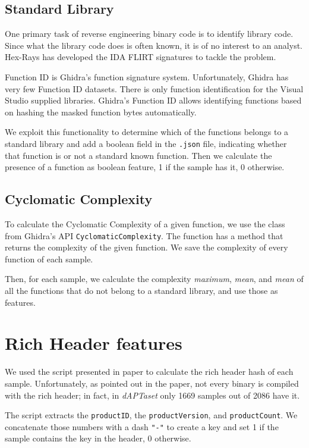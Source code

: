 \subsection{Standard Library}

One primary task of reverse engineering binary code is to identify library code. Since what the library code does is often known, it is of no interest to an analyst. Hex-Rays has developed the IDA FLIRT signatures to tackle the problem. 

Function ID is Ghidra's function signature system. Unfortunately, Ghidra has very few Function ID datasets. There is only function identification for the Visual Studio supplied libraries. Ghidra's Function ID allows identifying functions based on hashing the masked function bytes automatically\cite{ghidra_fid}.

We exploit this functionality to determine which of the functions belongs to a standard library and add a boolean field in the \texttt{.json} file, indicating whether that function is or not a standard known function. Then we calculate the presence of a function as boolean feature, 1 if the sample has it, 0 otherwise.

\subsection{Cyclomatic Complexity}

To calculate the Cyclomatic Complexity of a given function, we use the class from Ghidra's API \texttt{CyclomaticComplexity}. The function has a method that returns the complexity of the given function. We save the complexity of every function of each sample. 

Then, for each sample, we calculate the complexity \textit{maximum}, \textit{mean}, and \textit{mean} of all the functions that do not belong to a standard library, and use those as features.



\section{Rich Header features}
We used the script presented in paper \cite{dubyk2019sans} to calculate the rich header hash of each sample. Unfortunately, as pointed out in the paper, not every binary is compiled with the rich header; in fact, in \textit{dAPTaset} only 1669 samples out of 2086 have it. 

The script extracts the \texttt{productID}, the \texttt{productVersion}, and \texttt{productCount}. We concatenate those numbers with a dash \texttt{"-"} to create a key and set 1 if the sample contains the key in the header, 0 otherwise.

